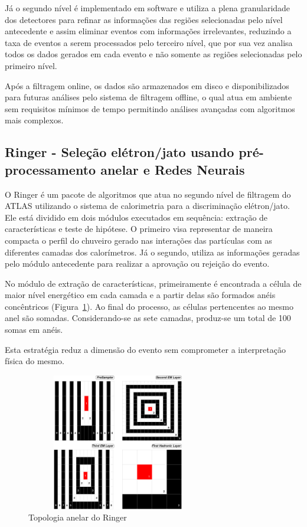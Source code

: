 \documentclass[a4paper,10pt,titlepage]{article}
\begin{document}
Já o segundo nível é implementado em software e utiliza a plena granularidade dos detectores para refinar as informações das regiões selecionadas pelo nível antecedente e assim eliminar eventos com informações irrelevantes, reduzindo a taxa de eventos a serem processados pelo terceiro nível, que por sua vez analisa todos os dados gerados em cada evento e não somente as regiões selecionadas pelo primeiro nível.

Após a filtragem online, os dados são armazenados em disco e disponibilizados para futuras análises pelo sistema de filtragem offline, o qual atua em ambiente sem requisitos mínimos de tempo permitindo análises avançadas com algoritmos mais complexos.

\subsection{Ringer - Seleção elétron/jato usando pré-processamento anelar e Redes Neurais}

O Ringer é um pacote de algoritmos que atua no segundo nível de filtragem do ATLAS utilizando o sistema de calorimetria para a discriminação elétron/jato.
Ele está dividido em dois módulos executados em sequência: extração de características e teste de hipótese.
O primeiro visa representar de maneira compacta o perfil do chuveiro gerado nas interações das partículas com as diferentes camadas dos calorímetros. 
Já o segundo, utiliza as informações geradas pelo módulo antecedente para realizar a aprovação ou rejeição do evento.

No módulo de extração de características, primeiramente é encontrada a célula de maior nível energético em cada camada e a partir delas são formados anéis concêntricos (Figura~\ref{fig:rings}).
Ao final do processo, as células pertencentes ao mesmo anel são somadas.
Considerando-se as sete camadas, produz-se um total de 100 somas em anéis.

Esta estratégia reduz a dimensão do evento sem comprometer a interpretação física do mesmo.

\begin{figure}[htbp!]
 \centering
 \includegraphics[width=8cm,height=6cm]{Figs/atlas/rings.pdf}
 \caption{Topologia anelar do Ringer}
 \label{fig:rings}
\end{figure}
\end{document}
